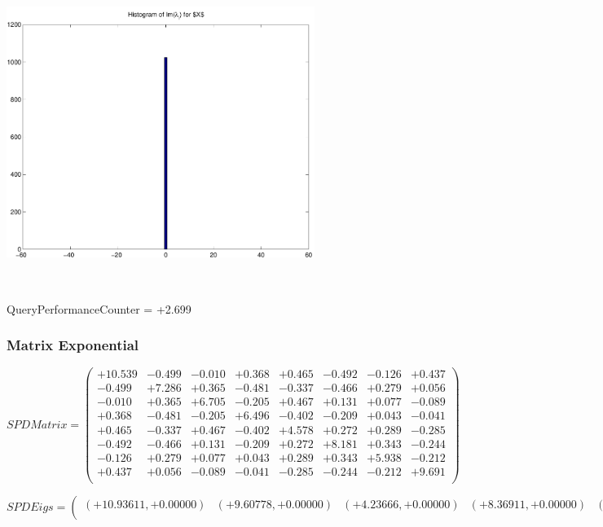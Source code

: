 \documentclass[9pt]{article}
\theoremstyle{plain}
\theoremstyle{definition}
\theoremstyle{remark}
\numberwithin{equation}{section}
\begin{document}
\includegraphics[width=10.0cm,height=10.0cm]{Im_lambda_n.pdf}

QueryPerformanceCounter  =  +2.699
\subsubsection{Matrix Exponential }
$SPD Matrix = \left(
\begin{array}{
cccccccc}
+10.539 & -0.499 & -0.010 & +0.368 & +0.465 & -0.492 & -0.126 & +0.437 \\
-0.499 & +7.286 & +0.365 & -0.481 & -0.337 & -0.466 & +0.279 & +0.056 \\
-0.010 & +0.365 & +6.705 & -0.205 & +0.467 & +0.131 & +0.077 & -0.089 \\
+0.368 & -0.481 & -0.205 & +6.496 & -0.402 & -0.209 & +0.043 & -0.041 \\
+0.465 & -0.337 & +0.467 & -0.402 & +4.578 & +0.272 & +0.289 & -0.285 \\
-0.492 & -0.466 & +0.131 & -0.209 & +0.272 & +8.181 & +0.343 & -0.244 \\
-0.126 & +0.279 & +0.077 & +0.043 & +0.289 & +0.343 & +5.938 & -0.212 \\
+0.437 & +0.056 & -0.089 & -0.041 & -0.285 & -0.244 & -0.212 & +9.691 \\
\end{array}
\right)$ \newline 

$SPD Eigs = \left(
\begin{array}{
cccccccc}
(+10.93611,+0.00000) & (+9.60778,+0.00000) & (+4.23666,+0.00000) & (+8.36911,+0.00000) & (+7.56229,+0.00000) & (+5.82791,+0.00000) & (+6.54198,+0.00000) & (+6.33139,+0.00000) \\
\end{array}
\right)$ \newline 
\end{document}
